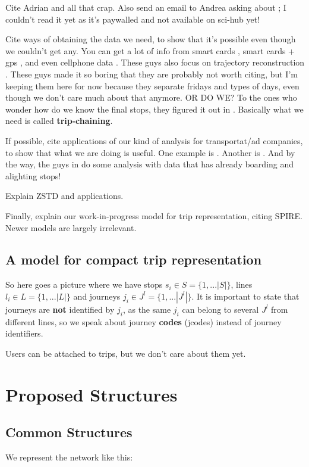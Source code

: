 \documentclass[runningheads]{llncs}
\begin{document}
Cite Adrian and all that crap. Also send an email to Andrea asking about \cite{rivera2018faster}; I couldn't read it yet as it's paywalled and not available on sci-hub yet!

Cite ways of obtaining the data we need, to show that it's possible even though we couldn't get any. You can get a lot of info from smart cards \cite{bhaskar2015passenger}, smart cards + gps \cite{ma2014development}, and even cellphone data \cite{liu2017exploring}. These guys also focus on trajectory reconstruction \cite{tao2014exploring}. These guys \cite{wang2014aggregated} made it so boring that they are probably not worth citing, but I'm keeping them here for now because they separate fridays and types of days, even though we don't care much about that anymore. OR DO WE? To the ones who wonder how do we know the final stops, they figured it out in \cite{alsger2016validating}. Basically what we need is called \textbf{trip-chaining}.

If possible, cite applications of our kind of analysis for transportat/ad companies, to show that what we are doing is useful. One example is \cite{tu2018spatial}. Another is \cite{zhang2017targeted}. And by the way, the guys in \cite{weng2018mining} do some analysis with data that has already boarding and alighting stops!

Explain ZSTD and applications.

Finally, explain our work-in-progress model for trip representation, citing SPIRE. Newer models are largely irrelevant.

\subsection{A model for compact trip representation}
So here goes a picture where we have stops $s_i \in S = \{1,...|S|\}$, lines $l_i \in L = \{1,...|L|\}$ and journeys $j_i \in J^l = \{1,...|J^l|\}$. It is important to state that journeys are \textbf{not} identified by $j_i$, as the same $j_i$ can belong to several $J^l$ from different lines, so we speak about journey \textbf{codes} (jcodes) instead of journey identifiers.

Users can be attached to trips, but we don't care about them yet.

\section{Proposed Structures}
\subsection{Common Structures}
We represent the network like this:
\end{document}
